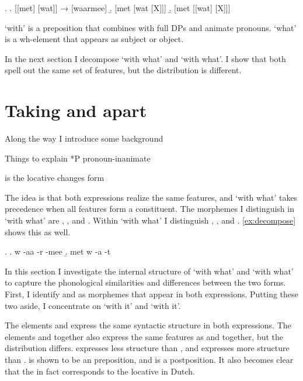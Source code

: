 \documentclass[12pt]{article}
\begin{document}
\ex.\label{ex:summaryconst}
\a. [[met] [wat]] → [waarmee]\label{ex:waarmeefr}
\b. [met [wat [X]]]
\b. [met [[wat] [X]]]\label{ex:metwatfr}

 `with' is a preposition that combines with full DPs and animate pronouns.  `what' is a wh-element that appears as subject or object.

In the next section I decompose  `with what' and  `with what'. I show that both spell out the same set of features, but the distribution is different.



\section{Taking  and  apart}

Along the way I introduce some background

Things to explain
*P pronoun-inanimate

 is the locative
 changes form

 The idea is that both expressions realize the same features, and  `with what' takes precedence when all features form a constituent. The morphemes I distinguish in  `with what' are , ,  and . Within  `with what' I distinguish , ,  and . \ref{ex:decompose} shows this as well.

\ex.\label{ex:decompose}
\a. w -aa -r -mee
\b. met w -a -t

In this section I investigate the internal structure of  `with what' and  `with what' to capture the phonological similarities and differences between the two forms. First, I identify  and  as morphemes that appear in both expressions. Putting these two aside, I concentrate on  `with it' and  `with it'.

The elements  and  express the same syntactic structure in both expressions. The elements  and  together also express the same features as  and  together, but the distribution differs.  expresses less structure than , and  expresses more structure than .  is shown to be an preposition, and  is a postposition. It also becomes clear that the  in fact corresponds to the locative  in Dutch.
\end{document}
